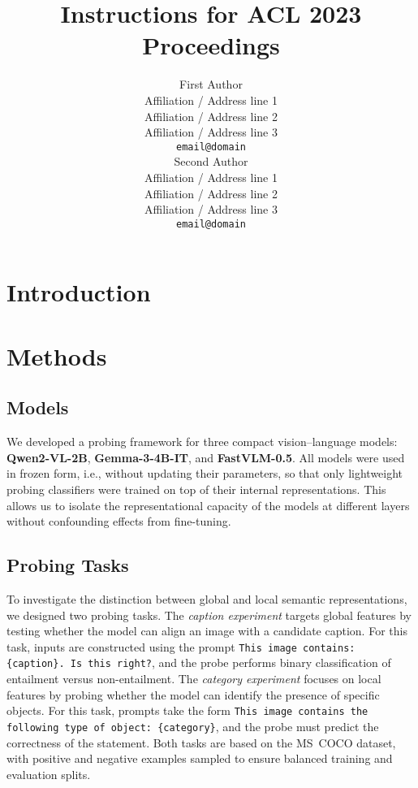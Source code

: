 \documentclass[11pt]{article}
\title{Instructions for ACL 2023 Proceedings}
\author{First Author \\
  Affiliation / Address line 1 \\
  Affiliation / Address line 2 \\
  Affiliation / Address line 3 \\
  \texttt{email@domain} \\\And
  Second Author \\
  Affiliation / Address line 1 \\
  Affiliation / Address line 2 \\
  Affiliation / Address line 3 \\
  \texttt{email@domain} \\}
\begin{document}
\maketitle
\begin{abstract}

\end{abstract}

\section{Introduction}
\section{Methods}

\subsection{Models}
We developed a probing framework for three compact vision--language models:
\textbf{Qwen2-VL-2B}, \textbf{Gemma-3-4B-IT}, and \textbf{FastVLM-0.5}.
All models were used in frozen form, i.e., without updating their parameters,
so that only lightweight probing classifiers were trained on top of their internal
representations. This allows us to isolate the representational capacity of the models
at different layers without confounding effects from fine-tuning.

\subsection{Probing Tasks}
To investigate the distinction between global and local semantic representations,
we designed two probing tasks. The \emph{caption experiment} targets global features
by testing whether the model can align an image with a candidate caption.
For this task, inputs are constructed using the prompt
\texttt{This image contains: \{caption\}. Is this right?},
and the probe performs binary classification of entailment versus non-entailment.
The \emph{category experiment} focuses on local features by probing whether the model
can identify the presence of specific objects. For this task, prompts take the form
\texttt{This image contains the following type of object: \{category\}},
and the probe must predict the correctness of the statement. Both tasks are based
on the MS~COCO dataset, with positive and negative examples sampled to ensure balanced
training and evaluation splits.
\end{document}
